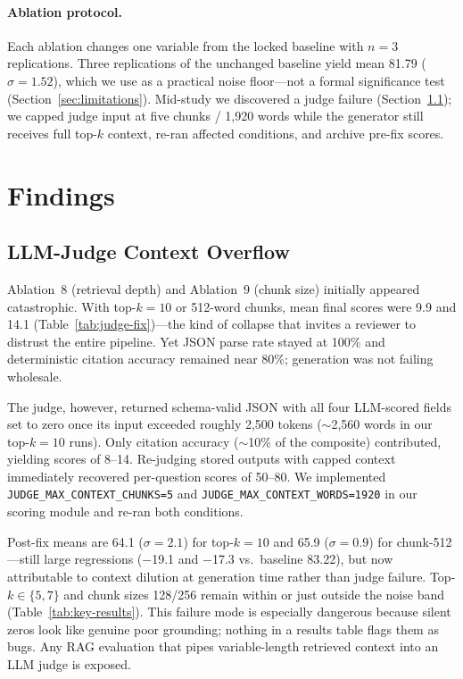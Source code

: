 \documentclass[11pt]{article}
\begin{document}
\paragraph{Ablation protocol.}
Each ablation changes one variable from the locked baseline with $n{=}3$ replications.
Three replications of the unchanged baseline yield mean 81.79 ($\sigma{=}1.52$), which we use as a practical noise floor---not a formal significance test (Section~\ref{sec:limitations}).
Mid-study we discovered a judge failure (Section~\ref{sec:judge}); we capped judge input at five chunks / 1,920 words while the generator still receives full top-$k$ context, re-ran affected conditions, and archive pre-fix scores.

\section{Findings}

\subsection{LLM-Judge Context Overflow}
\label{sec:judge}

Ablation~8 (retrieval depth) and Ablation~9 (chunk size) initially appeared catastrophic.
With top-$k{=}10$ or 512-word chunks, mean final scores were 9.9 and 14.1 (Table~\ref{tab:judge-fix})---the kind of collapse that invites a reviewer to distrust the entire pipeline.
Yet JSON parse rate stayed at 100\% and deterministic citation accuracy remained near 80\%; generation was not failing wholesale.

The judge, however, returned schema-valid JSON with all four LLM-scored fields set to zero once its input exceeded roughly 2,500 tokens (${\sim}$2,560 words in our top-$k{=}10$ runs).
Only citation accuracy (${\sim}$10\% of the composite) contributed, yielding scores of 8--14.
Re-judging stored outputs with capped context immediately recovered per-question scores of 50--80.
We implemented \texttt{JUDGE\_MAX\_CONTEXT\_CHUNKS=5} and \texttt{JUDGE\_MAX\_CONTEXT\_WORDS=1920} in our scoring module and re-ran both conditions.

Post-fix means are 64.1 ($\sigma{=}2.1$) for top-$k{=}10$ and 65.9 ($\sigma{=}0.9$) for chunk-512---still large regressions ($-$19.1 and $-$17.3 vs.\ baseline 83.22), but now attributable to context dilution at generation time rather than judge failure.
Top-$k \in \{5,7\}$ and chunk sizes 128/256 remain within or just outside the noise band (Table~\ref{tab:key-results}).
This failure mode is especially dangerous because silent zeros look like genuine poor grounding; nothing in a results table flags them as bugs.
Any RAG evaluation that pipes variable-length retrieved context into an LLM judge is exposed.
\end{document}
